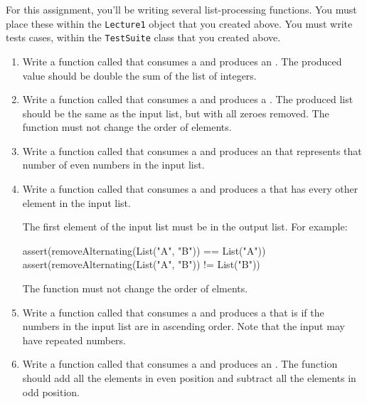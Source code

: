 \documentclass{book}
\begin{document}
For this assignment, you'll be writing several list-processing
functions. You must place these within the \verb|Lecture1| object that
you created above. You must write tests cases, within the \verb|TestSuite|
class that you created above.

\begin{enumerate}

  \item Write a function called  that consumes a
   and produces an . The produced
  value should be double the sum of the list of integers.

  \item Write a function called  that consumes a
   and produces a .
  The produced list should be the same as the input list, but with all zeroes
  removed. The function must not change the order of elements.

  \item Write a function called  that consumes a
   and produces an  that represents
  that number of even numbers in the input list.

  \item Write a function called  that consumes a
   and produces a  that
  has every other element in the input list.

  The first element of the input list must be in the output list.
  For example:
  \begin{scalacode}
  assert(removeAlternating(List("A", "B")) == List("A"))
  assert(removeAlternating(List("A", "B")) != List("B"))
  \end{scalacode}

  The function must not change the order of elments.

  \item Write a function called  that consumes a
   and produces a  that is
   if the numbers in the input list are in ascending order.
  Note that the input may have repeated numbers.

  \item Write a function called  that consumes a
   and produces an . The
  function should add all the elements in even position and subtract all the
  elements in odd position.


\end{enumerate}
\end{document}
